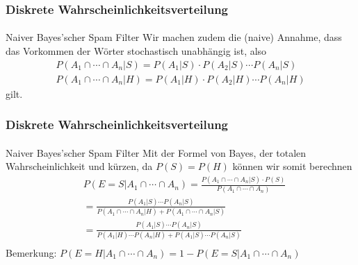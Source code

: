 \documentclass{beamer}
\begin{document}
\begin{frame}
    \frametitle{Diskrete Wahrscheinlichkeitsverteilung}
\framesubtitle{}

\begin{block}{Naiver Bayes'scher Spam Filter}
 Wir machen zudem die (naive) Annahme, dass das Vorkommen der Wörter  stochastisch unabhängig ist, also 
\begin{align*}
P(A_1 \cap \cdots \cap A_n | S) = P(A_1 | S) \cdot P(A_2 | S) \cdots P(A_n | S) \\
P(A_1 \cap \cdots \cap A_n | H) = P(A_1 | H) \cdot P(A_2 | H) \cdots P(A_n | H)
\end{align*}
gilt.
\end{block}

 \end{frame}


\begin{frame}
    \frametitle{Diskrete Wahrscheinlichkeitsverteilung}
\framesubtitle{}

\begin{block}{Naiver Bayes'scher Spam Filter}
Mit der Formel von Bayes, der totalen Wahrscheinlichkeit  und kürzen, da $P(S) = P(H)$ können wir somit berechnen
\begin{align*}
& P(E=S |  A_1 \cap \cdots \cap A_n) = \frac{P(A_1 \cap \cdots \cap A_n | S) \cdot P(S)}{P(A_1 \cap \cdots \cap A_n)} \\
&=  \frac{P(A_1 | S) \cdots P(A_n | S) }{P(A_1 \cap \cdots \cap A_n | H) + P(A_1 \cap \cdots \cap A_n | S)} \\
&=  \frac{P(A_1 | S) \cdots P(A_n | S) }{P(A_1 | H) \cdots P(A_n | H)  + P(A_1 | S) \cdots P(A_n | S) } \\
\end{align*}
Bemerkung: $P(E=H |  A_1 \cap \cdots \cap A_n) = 1- P(E=S |  A_1 \cap \cdots \cap A_n) $
\end{block}



 \end{frame}
\end{document}
